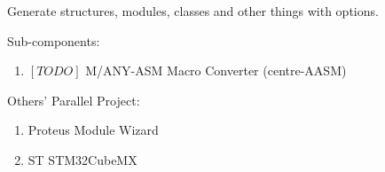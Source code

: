 Generate structures, modules, classes and other things with options.

Sub-components: 

\begin{enumerate}

\item $[TODO]$ M/ANY-ASM Macro Converter (centre-AASM)



\end{enumerate}

Others' Parallel Project: 

\begin{enumerate}

\item Proteus Module Wizard
\item ST STM32CubeMX
\end{enumerate}


